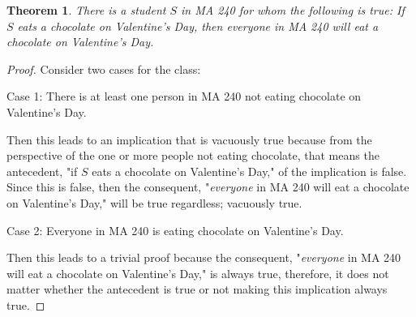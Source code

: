 \documentclass[11pt]{article}
\newtheorem{theorem}{Theorem}
\begin{document}
\begin{theorem}
	There is a student $S$ in MA 240 for whom the following is true: If $S$ eats a chocolate on Valentine's Day, then \textit{everyone} in MA 240 will eat a chocolate on Valentine's Day.
\end{theorem}

\begin{proof}
	

	Consider two cases for the class:

	Case 1: There is at least one person in MA 240 not eating chocolate on Valentine's Day.

	Then this leads to an implication that is vacuously true because from the perspective of the one or more people not eating chocolate, that means the antecedent, "if $S$ eats a chocolate on Valentine's Day," of the implication is false. Since this is false, then the consequent, "\textit{everyone} in MA 240 will eat a chocolate on Valentine's Day," will be true regardless; vacuously true.

	Case 2: Everyone in MA 240 is eating chocolate on Valentine's Day.

	Then this leads to a trivial proof because the consequent, "\textit{everyone} in MA 240 will eat a chocolate on Valentine's Day," is always true, therefore, it does not matter whether the antecedent is true or not making this implication always true.
\end{proof}


	
\end{document}
